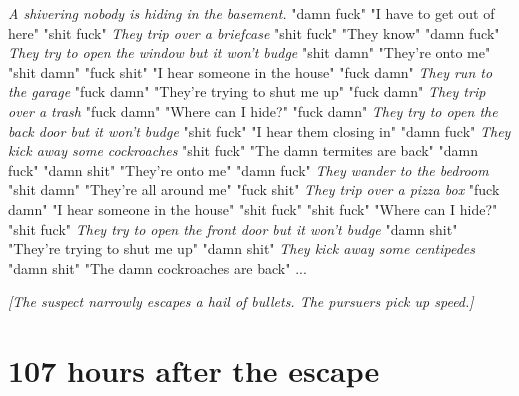 \documentclass{report}
\begin{document}
\textit{A shivering nobody is hiding in the basement.} "damn fuck" "I have to get out of here" "shit fuck" \textit{They trip over a briefcase} "shit fuck" "They know" "damn fuck" \textit{They try to open the window but it won't budge} "shit damn" "They're onto me" "shit damn" \textit{} "fuck shit" "I hear someone in the house" "fuck damn" \textit{They run to the garage} "fuck damn" "They're trying to shut me up" "fuck damn" \textit{They trip over a trash} "fuck damn" "Where can I hide?" "fuck damn" \textit{They try to open the back door but it won't budge} "shit fuck" "I hear them closing in" "damn fuck" \textit{They kick away some cockroaches} "shit fuck" "The damn termites are back" "damn fuck" \textit{} "damn shit" "They're onto me" "damn fuck" \textit{They wander to the bedroom} "shit damn" "They're all around me" "fuck shit" \textit{They trip over a pizza box} "fuck damn" "I hear someone in the house" "shit fuck" \textit{} "shit fuck" "Where can I hide?" "shit fuck" \textit{They try to open the front door but it won't budge} "damn shit" "They're trying to shut me up" "damn shit" \textit{They kick away some centipedes} "damn shit" "The damn cockroaches are back" \textit{}...

\textit{[The suspect narrowly escapes a hail of bullets. The pursuers pick up speed.]}


\section*{107 \small{hours after the escape}}
\end{document}
